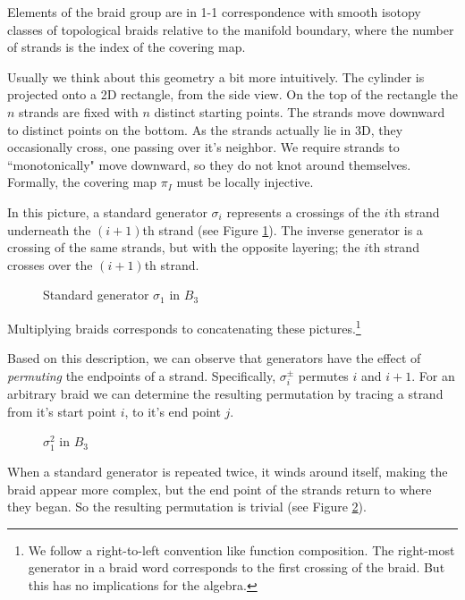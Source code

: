 \documentclass[12pt]{thesis}
\begin{document}
Elements of the braid group are in 1-1 correspondence with smooth isotopy classes of topological braids
relative to the manifold boundary,
where the number of strands is the index of the covering map.

Usually we think about this geometry a bit more intuitively.
The cylinder is projected onto a 2D 
rectangle, from the side view.
On the top of the rectangle
the $n$ strands are fixed with $n$ distinct starting points.
The strands move downward
to distinct points on the bottom.
As the strands actually lie in 3D,
they occasionally cross, one passing over it's neighbor.
We require strands to ``monotonically" move downward,
so they do not knot around themselves.
Formally, the covering map $\pi_{I}$ must be locally injective.

In this picture,
a standard generator $\sigma_{i}$ represents a crossings of the $i$th strand
underneath the $(i + 1)$th strand (see Figure \ref{fig:standard-generator}).
The inverse generator is a crossing of the same strands, but with the opposite layering;
the $i$th strand crosses over the $(i + 1)$th strand.
\begin{figure}[h]
    \centering
    \def\svgwidth{4cm}
    
    \caption{Standard generator $\sigma_{1}$ in $B_{3}$}
    \label{fig:standard-generator}
\end{figure}
Multiplying braids corresponds to concatenating these pictures.\footnote{We follow a right-to-left convention like function composition. The right-most generator
in a braid word corresponds to the first crossing of the braid.
But this has no implications for the algebra.}

Based on this description, we can observe that generators
have the effect of \textit{permuting} the endpoints of a strand.
Specifically, $\sigma_{i}^{\pm}$ permutes $i$ and $i+1$.
For an arbitrary braid we can determine
the resulting permutation by tracing a strand from it's start point $i$, to it's end point $j$.

\begin{figure}[h]
    \centering
    \def\svgwidth{4cm}
    
    \caption{$\sigma_{1}^{2}$ in $B_{3}$}
    \label{fig:generator-squared}
\end{figure}

When a standard generator is repeated twice, it winds around
itself, making the braid appear more complex,
but the end point of the strands return to where they began.
So the resulting  permutation is trivial
(see Figure \ref{fig:generator-squared}).
\end{document}
